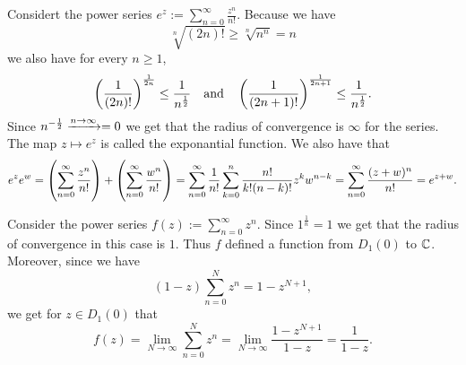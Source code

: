 \documentclass[11pt,a4paper]{article}
\begin{document}
\begin{example}
  Considert the power series $e^z := \sum_{n=0}^{\infty} \frac{z^n}{n!}$.
  Because we have
  \[
    \sqrt[n]{(2n)!} \geq \sqrt[n]{n^n} = n
  \]
  we also have for every $n \geq 1$,
  \[
    \del{\frac{1}{(2n)!}}^{\frac{1}{2n}} \le \frac{1}{n^{\half}}
    \tand
    \del{\frac{1}{(2n+1)!}}^{\frac{1}{2n+1}} \le \frac{1}{n^{\half}}.
  \]
  Since $n^{-\frac{1}{2}} \xrightarrow{n \to \infty} = 0$ we get that the radius of
  convergence is $\infty$ for the series.
  The map $z \mapsto e^z$ is called the exponantial function.
  We also have that
  \begin{align*}
    e^z e^w =
    \del{\sum_{n=0}^{\infty} \frac{z^n}{n!}} +
    \del{\sum_{n=0}^{\infty} \frac{w^n}{n!}} =
    \sum_{n=0}^{\infty}
    \frac{1}{n!} \sum_{k=0}^{n} \frac{n!}{k!(n-k)!} z^k w^{n-k} =
    \sum_{n=0}^{\infty} \frac{(z+w)^n}{n!} =
    e^{z + w}.
  \end{align*}
\end{example}

\begin{example}
  Consider the power series $f(z) := \sum_{n=0}^{\infty} z^n$.
  Since $1^{\frac 1n} = 1$ we get that the radius of convergence in
  this case is $1$.
  Thus $f$ defined a function from $D_1(0)$ to $\mathbb{C}$.
  Moreover, since we have
  \[
    (1 - z) \sum_{n=0}^{N} z^n = 1 - z^{N + 1},
  \]
  we get for $z \in D_1(0)$ that
  \[
    f(z) =
    \lim_{N \to \infty} \sum_{n=0}^{N} z^n =
    \lim_{N \to \infty} \frac{1 - z^{N + 1}}{1 - z} =
    \frac{1}{1 - z}.
  \]
\end{example}
\end{document}
